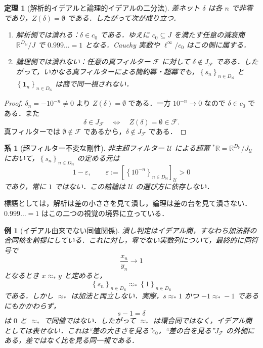 \documentclass[a4paper,11pt]{ltjsarticle}
\theoremstyle{jpdef}
\newtheorem{example}[definition]{例}
\theoremstyle{jpthm}
\newtheorem{theorem}[definition]{定理}
\newtheorem{corollary}[definition]{系}
\newcommand{\N}{\mathbb{N}}
\newcommand{\R}{\mathbb{R}}
\newcommand{\DN}{D_{\N}}
\newcommand{\seq}[2]{\left\{#1\right\}_{#2}}
\newcommand{\ulim}[1]{{}^{\ast}#1}
\newcommand{\eps}{\varepsilon}
\begin{document}
\begin{theorem}[解析的イデアルと論理的イデアルの二分法]
差ネット \(\delta\) は各 \(n\) で非零であり，\(Z(\delta)=\emptyset\) である．したがって次が成り立つ．
\begin{enumerate}
\item 解析側では潰れる：\(\delta\in c_0\) である．ゆえに \(c_0\subseteq J\) を満たす任意の減衰商 \(\R^{\DN}/J\) で \(0.999\ldots=1\) となる．Cauchy 実数や \(\ell^\infty/c_0\) はこの側に属する．
\item 論理側では潰れない：任意の真フィルター \(\mathcal F\) に対して \(\delta\notin J_{\mathcal F}\) である．したがって，いかなる真フィルターによる簡約冪・超冪でも，\(\seq{s_n}{n\in\DN}\) と \(\seq{\mathbf1_n}{n\in\DN}\) は商で同一視されない．
\end{enumerate}
\end{theorem}

\begin{proof}
\(\delta_n=-10^{-n}\ne0\) より \(Z(\delta)=\emptyset\) である．一方 \(10^{-n}\to0\) なので \(\delta\in c_0\) である．また
\[
  \delta\in J_{\mathcal F}
  \quad\Longleftrightarrow\quad
  Z(\delta)=\emptyset\in\mathcal F.
\]
真フィルターでは \(\emptyset\notin\mathcal F\) であるから，\(\delta\notin J_{\mathcal F}\) である．
\end{proof}

\begin{corollary}[超フィルター不変な剛性]
非主超フィルター \(\mathcal U\) による超冪 \(\ulim\R=\R^{\DN}/J_{\mathcal U}\) において，\(\seq{s_n}{n\in\DN}\) の定める元は
\[
  1-\eps,
  \qquad
  \eps:=[\seq{10^{-n}}{n\in\DN}]_{\mathcal U}>0
\]
であり，常に \(1\) ではない．この結論は \(\mathcal U\) の選び方に依存しない．
\end{corollary}

標語としては，解析は差の小ささを見て潰し，論理は差の台を見て潰さない．\(0.999\ldots=1\) はこの二つの視覚の境界に立っている．


\begin{example}[イデアル由来でない同値関係]
潰し判定はイデアル商，すなわち加法群の合同核を前提にしている．これに対し，零でない実数列について，最終的に同符号で
\[
  \frac{x_n}{y_n}\longrightarrow 1
\]
となるとき \(x\approx_* y\) と定めると，
\[
  \seq{s_n}{n\in\DN}\approx_*\seq{1}{n\in\DN}
\]
である．しかし \(\approx_*\) は加法と両立しない．実際，\(s\approx_*1\) かつ \(-1\approx_*-1\) であるにもかかわらず，
\[
  s-1=\delta
\]
は \(0\) と \(\approx_*\) で同値ではない．したがって \(\approx_*\) は環合同ではなく，イデアル商としては表せない．これは``差の大きさを見る''\(c_0\)，``差の台を見る''\(J_{\mathcal F}\) の外側にある，差ではなく比を見る同一視である．
\end{example}
\end{document}
